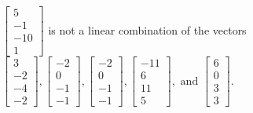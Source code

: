 \begin{exercise}
\begin{exerciseStatement}
  \end{exerciseStatement}
  \begin{exerciseAnswer}
   \(\left[\begin{array}{c}
5 \\
-1 \\
-10 \\
1
\end{array}\right]\) 
  	 is not  
	a linear combination of the vectors \(\left[\begin{array}{c}
3 \\
-2 \\
-4 \\
-2
\end{array}\right] , \left[\begin{array}{c}
-2 \\
0 \\
-1 \\
-1
\end{array}\right] , \left[\begin{array}{c}
-2 \\
0 \\
-1 \\
-1
\end{array}\right] , \left[\begin{array}{c}
-11 \\
6 \\
11 \\
5
\end{array}\right] , \text{ and } \left[\begin{array}{c}
6 \\
0 \\
3 \\
3
\end{array}\right]\).

	
  


  \end{exerciseAnswer}
\end{exercise}